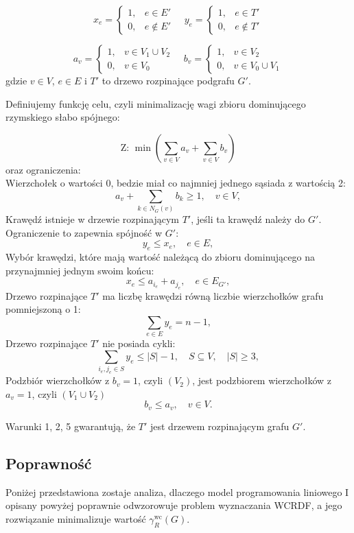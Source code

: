 \[
x_e =
\begin{cases}
1, & e \in E' \\
0, & e \notin E'
\end{cases}
\quad
y_e =
\begin{cases}
1, & e \in T' \\
0, & e \notin T'
\end{cases}
\]

\[
a_v =
\begin{cases}
1, & v \in V_1 \cup V_2 \\
0, & v \in V_0
\end{cases}
\quad
b_v =
\begin{cases}
1, & v \in V_2 \\
0, & v \in V_0 \cup V_1
\end{cases}
\]
gdzie \( v \in V \), \( e \in E \) i \( T' \) to drzewo rozpinające podgrafu \( G' \).

Definiujemy funkcję celu, czyli minimalizację wagi zbioru dominującego rzymskiego słabo spójnego:

\[
\text{Z: } \min \left( \sum_{v \in V} a_v + \sum_{v \in V} b_v \right)
\]
oraz ograniczenia:\\
Wierzchołek o wartości 0, bedzie miał co najmniej jednego sąsiada z wartością 2:
\[
    a_v + \sum_{k \in N_G(v)} b_k \geq 1, \quad v \in V, \tag{1}
\]
Krawędź istnieje w drzewie rozpinającym \( T' \), jeśli ta krawędź należy do \( G' \). Ograniczenie to zapewnia spójność w \( G' \):
\[
    y_e \leq x_e, \quad e \in E, \tag{2}
\]
Wybór krawędzi, które mają  wartość należącą do zbioru dominującego na przynajmniej jednym swoim końcu:
\[
    x_e \leq a_{i_e} + a_{j_e}, \quad e \in E_{G'}, \tag{3}
\]
Drzewo rozpinające \( T' \) ma liczbę krawędzi równą liczbie wierzchołków grafu pomniejszoną o 1:
\[
    \sum_{e \in E} y_e = n - 1, \tag{4}
\]
Drzewo rozpinające \( T' \) nie posiada cykli:
\[
    \sum_{i_e, j_e \in S} y_e \leq |S| - 1, \quad S \subseteq V, \quad |S| \geq 3, \tag{5}
\]
Podzbiór wierzchołków z $b_v = 1$, czyli $(V_2)$, jest podzbiorem wierzchołków z $a_v = 1$, czyli $(V_1 \cup V_2)$
\[
    b_v \leq a_v, \quad v \in V. \tag{6}
\]

Warunki 1, 2, 5 gwarantują, że \( T' \) jest drzewem rozpinającym grafu \( G' \).

\subsection{Poprawność}

Poniżej przedstawiona zostaje analiza, dlaczego model programowania liniowego I opisany powyżej poprawnie odwzorowuje problem wyznaczania WCRDF, a jego rozwiązanie minimalizuje wartość $\gamma_R^{\text{wc}}(G)$.


